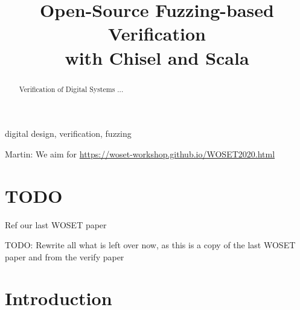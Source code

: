 \documentclass[conference]{IEEEtran}
\newcommand{\todo}[1]{{\color{olive} TODO: #1}}
\newcommand{\martin}[1]{{\color{blue} Martin: #1}}
\begin{document}

\title{Open-Source Fuzzing-based Verification\\ with Chisel and Scala}

\author{


}


\maketitle \thispagestyle{empty}

\begin{abstract}

Verification of Digital Systems ...

\end{abstract}

\begin{IEEEkeywords}
digital design, verification, fuzzing
\end{IEEEkeywords}

\martin{We aim for \url{https://woset-workshop.github.io/WOSET2020.html}}

\section{TODO}

Ref our last WOSET paper

\todo{Rewrite all what is left over now, as this is a copy of the last WOSET paper and from the verify paper}


\section{Introduction}
\label{sec:intro}
\end{document}
